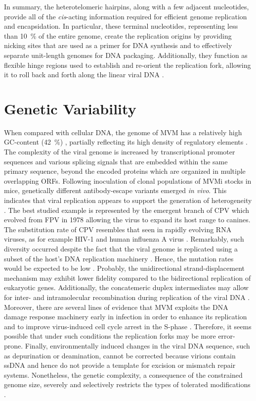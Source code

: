 In summary, the heterotelomeric hairpins, along with a few adjacent nucleotides, provide all of the \textit{cis}-acting information required for efficient genome replication and encapsidation. In particular, these terminal nucleotides, representing less than 10~\% of the entire genome, create the replication origins by providing nicking sites that are used as a primer for DNA synthesis and to effectively separate unit-length genomes for DNA packaging. Additionally, they function as flexible hinge regions used to establish and re-orient the replication fork, allowing it to roll back and forth along the linear viral DNA \cite{telomere2, telomere3, handbook, RHR}.        


\section{Genetic Variability}

When compared with cellular DNA, the genome of MVM has a relatively high GC-content (42~\%) \cite{pmid6298737}, partially reflecting its high density of regulatory elements \cite{telomere}. The complexity of the viral genome is increased by transcriptional promoter sequences and various splicing signals that are embedded within the same primary sequence, beyond the encoded proteins which are organized in multiple overlapping ORFs. Following inoculation of clonal populations of MVMi stocks in mice, genetically different antibody-escape variants emerged \textit{in vivo}. This indicates that viral replication appears to support the generation of heterogeneity \cite{pmid12552010}. The best studied example is represented by the emergent branch of CPV which evolved from FPV in 1978 allowing the virus to expand its host range to canines. The substitution rate of CPV resembles that seen in rapidly evolving RNA viruses, as for example HIV-1 and human influenza A virus \cite{pmid15626758}. Remarkably, such diversity occurred despite the fact that the viral genome is replicated using a subset of the host's DNA replication machinery \cite{pmid8614999, pmid10792046}. Hence, the mutation rates would be expected to be low \cite{pmid15964835, pmid19540301}. Probably, the unidirectional strand-displacement mechanism may exhibit lower fidelity compared to the bidirectional replication of eukaryotic genes. Additionally, the concatemeric duplex intermediates may allow for inter- and intramolecular recombination during replication of the viral DNA \cite{telomere}. Moreover, there are several lines of evidence that MVM exploits the DNA damage response machinery early in infection in order to enhance its replication and to improve virus-induced cell cycle arrest in the S-phase \cite{pmid20949077}. Therefore, it seems possible that under such conditions the replication forks may be more error-prone. Finally, environmentally induced changes in the viral DNA sequence, such as depurination or deamination, cannot be corrected because virions contain ssDNA and hence do not provide a template for excision or mismatch repair systems. Nonetheless, the genetic complexity, a consequence of the constrained genome size, severely and selectively restricts the types of tolerated modifications \cite{telomere}.   

